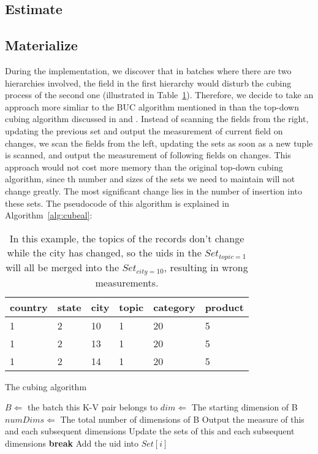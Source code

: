 \documentclass{article}
\newcommand{\algorithmicbreak}{\textbf{break}}
\newcommand{\BREAK}{\STATE \algorithmicbreak}
\begin{document}
\paragraph{}

\subsection{Estimate}

\subsection{Materialize}

During the implementation, we discover that in batches where there are two hierarchies involved, the field in the first hierarchy would disturb the cubing process of the second one (illustrated in Table~\ref{table:interrupt}). Therefore, we decide to take an approach more simliar to the BUC algorithm mentioned in \cite{beyer1999bottom} than the top-down cubing algorithm discussed in \cite{agarwal1996computation} and \cite{zhao1997array}. Instead of scanning the fields from the right, updating the previous set and output the measurement of current field on changes, we scan the fields from the left, updating the sets as soon as a new tuple is scanned, and output the measurement of following fields on changes. This approach would not cost more memory than the original top-down cubing algorithm, since th number and sizes of the sets we need to maintain will not change greatly. The most significant change lies in the number of insertion into these sets. The pseudocode of this algorithm is explained in Algorithm~\ref{alg:cubeal}:

\begin{table}[H]
\centering
\begin{tabular}{l l l l l l}
country & state & city & topic & category & product \\
\hline
1 & 2 & 10 & 1 & 20 & 5 \\
1 & 2 & 13 & 1 & 20 & 5 \\
1 & 2 & 14 & 1 & 20 & 5

\end{tabular}
\caption{In this example, the topics of the records don't change while the city has changed, so the uids in the $Set_{topic=1}$ will all be merged into the $Set_{city=10}$, resulting in wrong measurements.}
\label{table:interrupt}
\end{table}

\begin{algorithm}[H]
\centering
\caption{The cubing algorithm}
\label{alg:cubeal}
\begin{algorithmic}[1]  
\STATE $B \Leftarrow$ the batch this K-V pair belongs to
\STATE $dim \Leftarrow$ The starting dimension of B
\STATE $numDims \Leftarrow$ The total number of dimensions of B
\STATE Output the measure of this and each subsequent dimensions
\STATE Update the sets of this and each subsequent dimensions
\BREAK
\ELSE
\STATE Add the uid into $Set[i]$
\ENDIF
\ENDFOR
\ENDFOR   
\end{algorithmic}  
\end{algorithm}
\end{document}
